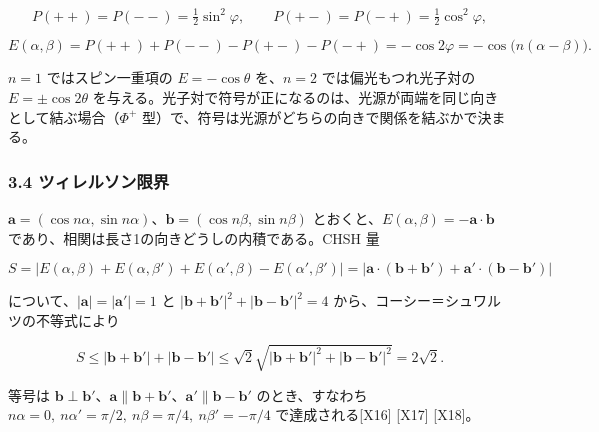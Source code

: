 \documentclass[
  a4paper,
]{ltjsarticle}
\begin{document}
\[
P(++)=P(--)=\tfrac12\sin^{2}\varphi,\qquad P(+-)=P(-+)=\tfrac12\cos^{2}\varphi,
\]

\[
E(\alpha,\beta)=P(++)+P(--)-P(+-)-P(-+)=-\cos 2\varphi=-\cos\bigl(n(\alpha-\beta)\bigr).
\]

\(n=1\) ではスピン一重項の \(E=-\cos\theta\) を、\(n=2\)
では偏光もつれ光子対の \(E=\pm\cos 2\theta\)
を与える。光子対で符号が正になるのは、光源が両端を同じ向きとして結ぶ場合（\(\Phi^{+}\)
型）で、符号は光源がどちらの向きで関係を結ぶかで決まる。

\subsubsection{3.4
ツィレルソン限界}\label{ux30c4ux30a3ux30ecux30ebux30bdux30f3ux9650ux754c}

\(\boldsymbol{a}=(\cos n\alpha,\sin n\alpha)\)、\(\boldsymbol{b}=(\cos n\beta,\sin n\beta)\)
とおくと、\(E(\alpha,\beta)=-\boldsymbol{a}\cdot\boldsymbol{b}\)
であり、相関は長さ1の向きどうしの内積である。CHSH 量

\[
S=\bigl|E(\alpha,\beta)+E(\alpha,\beta')+E(\alpha',\beta)-E(\alpha',\beta')\bigr|
=\bigl|\boldsymbol{a}\cdot(\boldsymbol{b}+\boldsymbol{b}')+\boldsymbol{a}'\cdot(\boldsymbol{b}-\boldsymbol{b}')\bigr|
\]

について、\(|\boldsymbol{a}|=|\boldsymbol{a}'|=1\) と
\(|\boldsymbol{b}+\boldsymbol{b}'|^{2}+|\boldsymbol{b}-\boldsymbol{b}'|^{2}=4\)
から、コーシー＝シュワルツの不等式により

\[
S\le|\boldsymbol{b}+\boldsymbol{b}'|+|\boldsymbol{b}-\boldsymbol{b}'|\le\sqrt{2}\sqrt{|\boldsymbol{b}+\boldsymbol{b}'|^{2}+|\boldsymbol{b}-\boldsymbol{b}'|^{2}}=2\sqrt{2}.
\]

等号は
\(\boldsymbol{b}\perp\boldsymbol{b}'\)、\(\boldsymbol{a}\parallel\boldsymbol{b}+\boldsymbol{b}'\)、\(\boldsymbol{a}'\parallel\boldsymbol{b}-\boldsymbol{b}'\)
のとき、すなわち
\(n\alpha=0,\ n\alpha'=\pi/2,\ n\beta=\pi/4,\ n\beta'=-\pi/4\)
で達成される{[}X16{]} {[}X17{]} {[}X18{]}。
\end{document}
